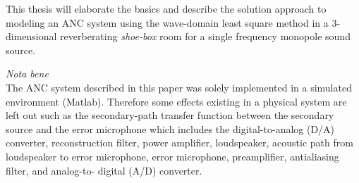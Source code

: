 This thesis will elaborate the basics and describe the solution approach to modeling an ANC system using the wave-domain least square method in a 3-dimensional reverberating \textit{shoe-box} room for a single frequency monopole sound source.


\textit{Nota bene}\\
The ANC system described in this paper was solely implemented in a simulated environment (Matlab). Therefore some effects existing in a physical system are left out such as the secondary-path transfer function between the secondary source and the error microphone which includes the digital-to-analog (D/A) converter, reconstruction filter, power amplifier, loudspeaker, acoustic path from loudspeaker to error microphone, error microphone, preamplifier, antialiasing filter, and analog-to- digital (A/D) converter.\cite{Kuo1999}


